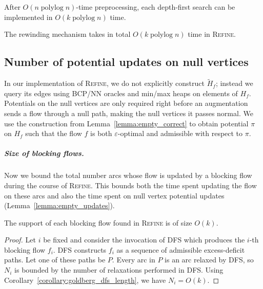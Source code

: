 \documentclass[a4paper,UKenglish]{socg-lipics-v2018}
\makeatletter
\def\polylog{\mathop{\mathrm{polylog}}}
\def\eps{\varepsilon}
\theoremstyle{plain}
\numberwithin{figure}{section}
\renewcommand{\paragraph}{\subparagraph}
\def\n@te#1{\textsf{\boldmath \textbf{$\langle\!\langle$#1$\rangle\!\rangle$}}\leavevmode}
\def\note#1{\textcolor{red}{\n@te{#1}}}
\renewcommand{\note}[1]{} %
\makeatother
\begin{document}
\begin{toappendix}
\begin{lemmarep}
\label{lemma:goldberg_dfs_time}
After $O(n \polylog n)$-time preprocessing,
each depth-first search can be implemented in $O(k \polylog n)$ time.
\end{lemmarep}

\begin{lemmarep}
The rewinding mechanism takes in total $O(k\polylog n)$ time in \textsc{Refine}.
\end{lemmarep}


\subsection{Number of potential updates on null vertices}
\label{SSA:null-potential-update}

In our implementation of \textsc{Refine}, we do not explicitly construct $\tilde{H}_f$; instead we query its edges using BCP/NN
oracles and min/max heaps on elements of $H_f$.
Potentials on the null vertices are only required right before an augmentation sends a flow through a
null path, making the null vertices it passes normal.
We use the construction from Lemma~\ref{lemma:empty_correct}
to obtain potential $\pi$ on $H_f$ such that the flow $f$ is both $\eps$-optimal and admissible with respect to $\pi$.

\paragraph{Size of blocking flows.}

Now we bound the total number arcs whose flow is updated by a blocking flow during the course of \textsc{Refine}.
This bounds both the time spent updating the flow on these arcs and also the time spent on null vertex potential updates
(Lemma~\ref{lemma:empty_updates}).

\begin{lemmarep}
\label{lemma:goldberg_bf_size}
The support of each blocking flow %
found in \textsc{Refine} is of size $O(k)$.
\end{lemmarep}

\begin{proof}
Let $i$ be fixed and consider the invocation of \textsc{DFS} which produces the
$i$-th blocking flow $f_i$.
\textsc{DFS} constructs $f_i$ as a sequence of admissible excess-deficit paths.
Let one of these paths be $P$.
Every arc in $P$ is an arc relaxed by \textsc{DFS}, so $N_i$ is bounded by the
number of relaxations performed in \textsc{DFS}.
Using Corollary~\ref{corollary:goldberg_dfs_length}, we have $N_i = O(k)$.
\end{proof}



\end{toappendix}
\end{document}
